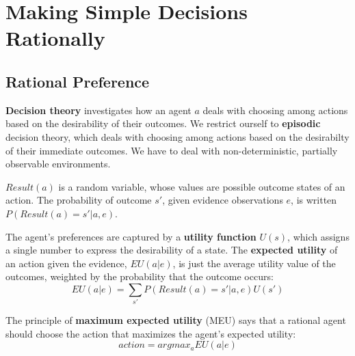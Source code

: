 \documentclass{scrartcl}
\begin{document}
\section{Making Simple Decisions Rationally}
\subsection{Rational Preference}
\textbf{Decision theory} investigates how an agent \(a\) deals with choosing among actions based on the desirability of their outcomes. We restrict ourself to \textbf{episodic} decision theory, which deals with choosing among actions based on the desirabilty of their immediate outcomes. We have to deal with non-deterministic, partially observable environments.

\bigbreak

\(Result(a)\) is a random variable, whose values are possible outcome states of an action. The probability of outcome \(s'\), given evidence observations \(e\), is written
\(P(Result(a) = s' | a,e)\).

The agent's preferences are captured by a \textbf{utility function} \(U(s)\), which assigns a single number to express the desirability of a state. The \textbf{expected utility} of an action given the evidence, \(EU(a|e)\), is just the average utility value of the outcomes, weighted by the probability that the outcome occurs:
\[EU(a|e) = \sum_{s'} P(Result(a) = s'|a,e)U(s')\]

The principle of \textbf{maximum expected utility} (MEU) says that a rational agent should choose the action that maximizes the agent's expected utility:
\[action = argmax_a EU(a|e)\]
\end{document}
